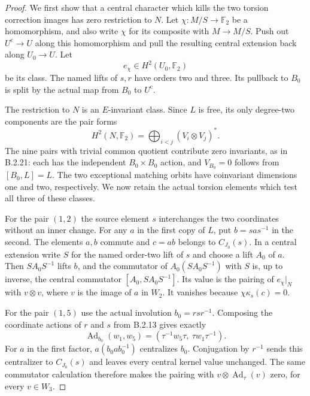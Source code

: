 \begin{proof}
We first show that a central character which kills the
two torsion correction images has zero restriction to
$N$.  Let $\chi:M/S\to\mathbb F_2$ be a homomorphism,
and also write $\chi$ for its composite with $M\to M/S$.
Push out $U^{\mathrm c}\to U$ along this homomorphism
and pull the resulting central extension back along
$U_0\to U$.  Let
\[
                     e_\chi\in H^2(U_0,\mathbb F_2)          \tag{B.S66}
\]
be its class.  The named lifts of $s,r$ have orders two
and three.  Its pullback to $B_0$ is split by the actual
map from $B_0$ to $U^{\mathrm c}$.

The restriction to $N$ is an $E$-invariant class.
Since $L$ is free, its only degree-two components are
the pair forms
\[
 H^2(N,\mathbb F_2)=
       \bigoplus_{i<j}(V_i\otimes V_j)^* .                   \tag{B.S67}
\]
The nine pairs with trivial common quotient contribute
zero invariants, as in B.2.21: each has the independent
$B_0\times B_0$ action, and $V_{B_0}=0$ follows from
$[B_0,L]=L$.  The two exceptional matching orbits have
coinvariant dimensions one and two, respectively.
We now retain the actual torsion elements which test
all three of these classes.

For the pair $(1,2)$ the source element $s$ interchanges
the two coordinates without an inner change.  For any
$a$ in the first copy of $L$, put $b=sas^{-1}$ in the
second.  The elements $a,b$ commute and
$c=ab$ belongs to $C_{J_0}(s)$.  In a central extension
write $S$ for the named order-two lift of $s$ and choose
a lift $A_0$ of $a$.  Then $S A_0 S^{-1}$ lifts $b$,
and the commutator of $A_0(S A_0 S^{-1})$ with $S$
is, up to inverse, the central commutator
$[A_0,S A_0 S^{-1}]$.  Its value is the pairing of
$e_\chi|_N$ with $v\otimes v$, where $v$ is the
image of $a$ in $W_2$.  It vanishes because
$\chi\kappa_s(c)=0$.

For the pair $(1,5)$ use the actual involution
$b_0=rsr^{-1}$.  Composing the coordinate actions of
$r$ and $s$ from B.2.13 gives exactly
\[
 \operatorname{Ad}_{b_0}(w_1,w_5)=
       (\tau^{-1}w_5\tau,\ \tau w_1\tau^{-1}).              \tag{B.S68}
\]
For $a$ in the first factor, $a(b_0ab_0^{-1})$
centralizes $b_0$.  Conjugation by $r^{-1}$ sends this
centralizer to $C_{J_0}(s)$ and leaves every central
kernel value unchanged.  The same commutator calculation
therefore makes the pairing with
$v\otimes\operatorname{Ad}_\tau(v)$ zero, for every
$v\in W_3$.


\end{proof}
